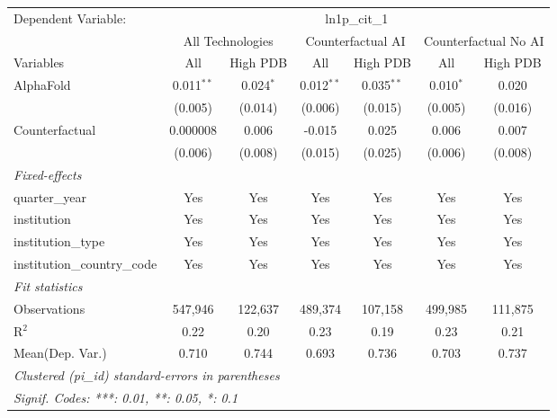 \begingroup
\centering
\begin{tabular}{lcccccc}
   \tabularnewline \midrule \midrule
   Dependent Variable: & \multicolumn{6}{c}{ln1p\_cit\_1}\\
 & \multicolumn{2}{c}{All Technologies} & \multicolumn{2}{c}{Counterfactual AI} & \multicolumn{2}{c}{Counterfactual No AI} \\
\cmidrule(lr){1-1}\cmidrule(lr){2-3} \cmidrule(lr){4-5} \cmidrule(lr){6-7}
Variables & \multicolumn{1}{c}{All} & \multicolumn{1}{c}{High PDB} & \multicolumn{1}{c}{All} & \multicolumn{1}{c}{High PDB} & \multicolumn{1}{c}{All} & \multicolumn{1}{c}{High PDB} \\
\cmidrule(lr){1-1}\cmidrule(lr){2-2} \cmidrule(lr){3-3} \cmidrule(lr){4-4} \cmidrule(lr){5-5} \cmidrule(lr){6-6} \cmidrule(lr){7-7}
   AlphaFold                    & 0.011$^{**}$ & 0.024$^{*}$ & 0.012$^{**}$ & 0.035$^{**}$ & 0.010$^{*}$ & 0.020\\   
                                & (0.005)      & (0.014)     & (0.006)      & (0.015)      & (0.005)     & (0.016)\\   
   Counterfactual               & 0.000008     & 0.006       & -0.015       & 0.025        & 0.006       & 0.007\\   
                                & (0.006)      & (0.008)     & (0.015)      & (0.025)      & (0.006)     & (0.008)\\   
   \midrule
   \emph{Fixed-effects}\\
   quarter\_year                & Yes          & Yes         & Yes          & Yes          & Yes         & Yes\\  
   institution                  & Yes          & Yes         & Yes          & Yes          & Yes         & Yes\\  
   institution\_type            & Yes          & Yes         & Yes          & Yes          & Yes         & Yes\\  
   institution\_country\_code   & Yes          & Yes         & Yes          & Yes          & Yes         & Yes\\  
   \midrule
   \emph{Fit statistics}\\
   Observations                 & 547,946      & 122,637     & 489,374      & 107,158      & 499,985     & 111,875\\  
   R$^2$                        & 0.22         & 0.20        & 0.23         & 0.19         & 0.23        & 0.21\\  
Mean(Dep. Var.) & 0.710 & 0.744 & 0.693 & 0.736 & 0.703 & 0.737 \\
   \midrule \midrule
   \multicolumn{7}{l}{\emph{Clustered (pi\_id) standard-errors in parentheses}}\\
   \multicolumn{7}{l}{\emph{Signif. Codes: ***: 0.01, **: 0.05, *: 0.1}}\\
\end{tabular}
\par\endgroup
